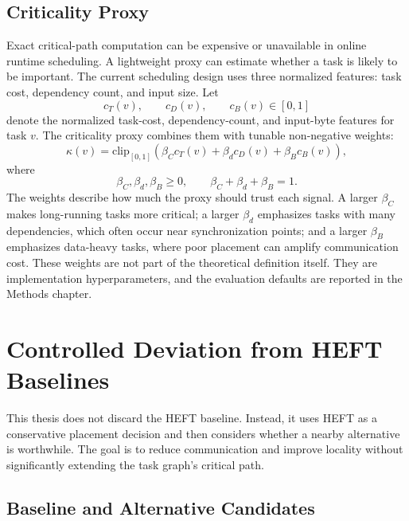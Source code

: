 \subsection{Criticality Proxy}
\label{subsec:criticality_proxy}

Exact critical-path computation can be expensive or unavailable in online runtime scheduling. A lightweight proxy can estimate whether a task is likely to be important. The current scheduling design uses three normalized features: task cost, dependency count, and input size. Let
\begin{equation}
c_T(v),\qquad c_D(v),\qquad c_B(v) \in [0,1]
\end{equation}
denote the normalized task-cost, dependency-count, and input-byte features for task $v$. The criticality proxy combines them with tunable non-negative weights:
\begin{equation}
\kappa(v) = \mathrm{clip}_{[0,1]}\left(
\beta_C c_T(v) + \beta_d c_D(v) + \beta_B c_B(v)
\right),
\label{eq:criticality_proxy}
\end{equation}
where
\begin{equation}
\beta_C,\beta_d,\beta_B \geq 0,
\qquad
\beta_C+\beta_d+\beta_B=1.
\end{equation}
The weights describe how much the proxy should trust each signal. A larger $\beta_C$ makes long-running tasks more critical; a larger $\beta_d$ emphasizes tasks with many dependencies, which often occur near synchronization points; and a larger $\beta_B$ emphasizes data-heavy tasks, where poor placement can amplify communication cost. These weights are not part of the theoretical definition itself. They are implementation hyperparameters, and the evaluation defaults are reported in the Methods chapter.

\section{Controlled Deviation from HEFT Baselines}
\label{sec:theory_controlled_deviation}

This thesis does not discard the HEFT baseline. Instead, it uses HEFT as a conservative placement decision and then considers whether a nearby alternative is worthwhile. The goal is to reduce communication and improve locality without significantly extending the task graph's critical path.

\subsection{Baseline and Alternative Candidates}
\label{subsec:baseline_alt_candidates}


